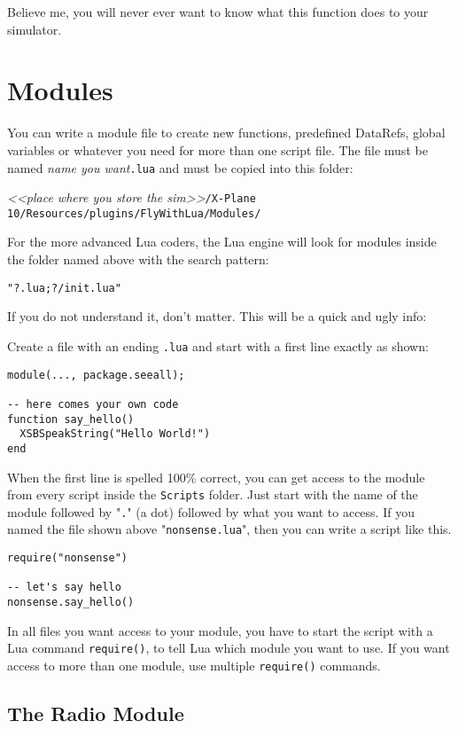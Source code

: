 \documentclass[11pt,parskip=half,a4paper]{scrartcl}
\begin{document}
Believe me, you will never ever want to know what this function does to your simulator.

\newpage
\section{Modules}

You can write a module file to create new functions, predefined DataRefs, global variables or whatever you need for more than one script file. The file must be named \emph{name you want}\verb|.lua| and must be copied into this folder:

\emph{<<place where you store the sim>>}\verb|/X-Plane 10/Resources/plugins/FlyWithLua/Modules/|

For the more advanced Lua coders, the Lua engine will look for modules inside the folder named above with the search pattern:

\verb|"?.lua;?/init.lua"|

If you do not understand it, don't matter. This will be a quick and ugly info:

Create a file with an ending \verb|.lua| and start with a first line exactly as shown:

\begin{lstlisting}
module(..., package.seeall);

-- here comes your own code
function say_hello()
  XSBSpeakString("Hello World!")
end
\end{lstlisting}

When the first line is spelled 100\% correct, you can get access to the module from every script inside the \verb|Scripts| folder. Just start with the name of the module followed by "\verb|.|" (a dot) followed by what you want to access. If you named the file shown above "\verb|nonsense.lua|", then you can write a script like this.

\begin{lstlisting}
require("nonsense")

-- let's say hello
nonsense.say_hello()
\end{lstlisting}

In all files you want access to your module, you have to start the script with a Lua command \verb|require()|, to tell Lua which module you want to use. If you want access to more than one module, use multiple \verb|require()| commands.

\subsection{The Radio Module}
\end{document}
